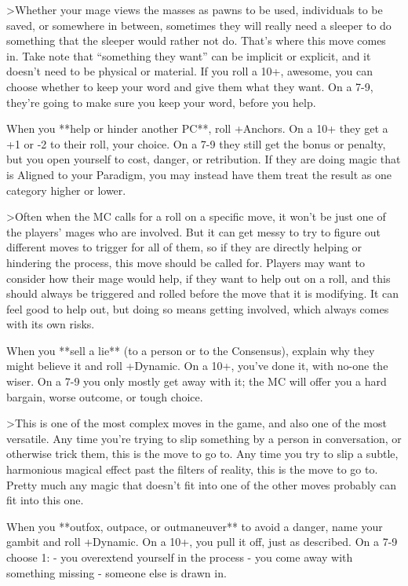 \documentclass[
  oneside,
  statementpaper,
  9pt]{memoir}
\begin{document}
\begin{Player}
>Whether your mage views the masses as pawns to be used, individuals to be saved, or somewhere in between, sometimes they will really need a sleeper to do something that the sleeper would rather not do. That’s where this move comes in. Take note that “something they want” can be implicit or explicit, and it doesn’t need to be physical or material. If you roll a 10+, awesome, you can choose whether to keep your word and give them what they want. On a 7-9, they’re going to make sure you keep your word, before you help.

When you **help or hinder another PC**, roll +Anchors. On a 10+ they get a +1 or -2 to their roll, your choice. On a 7-9 they still get the bonus or penalty, but you open yourself to cost, danger, or retribution. If they are doing magic that is Aligned to your Paradigm, you may instead have them treat the result as one category higher or lower.

>Often when the MC calls for a roll on a specific move, it won’t be just one of the players’ mages who are involved. But it can get messy to try to figure out different moves to trigger for all of them, so if they are directly helping or hindering the process, this move should be called for. Players may want to consider how their mage would help, if they want to help out on a roll, and this should always be triggered and rolled before the move that it is modifying. It can feel good to help out, but doing so means getting involved, which always comes with its own risks.

When you **sell a lie** (to a person or to the Consensus), explain why they might believe it and roll +Dynamic. On a 10+, you’ve done it, with no-one the wiser. On a 7-9 you only mostly get away with it; the MC will offer you a hard bargain, worse outcome, or tough choice.

>This is one of the most complex moves in the game, and also one of the most versatile. Any time you're trying to slip something by a person in conversation, or otherwise trick them, this is the move to go to. Any time you try to slip a subtle, harmonious magical effect past the filters of reality, this is the move to go to. Pretty much any magic that doesn't fit into one of the other moves probably can fit into this one.

When you **outfox, outpace, or outmaneuver** to avoid a danger, name your gambit and roll +Dynamic. On a 10+, you pull it off, just as described. On a 7-9 choose 1:
- you overextend yourself in the process
- you come away with something missing
- someone else is drawn in.


\end{Player}
\end{document}
